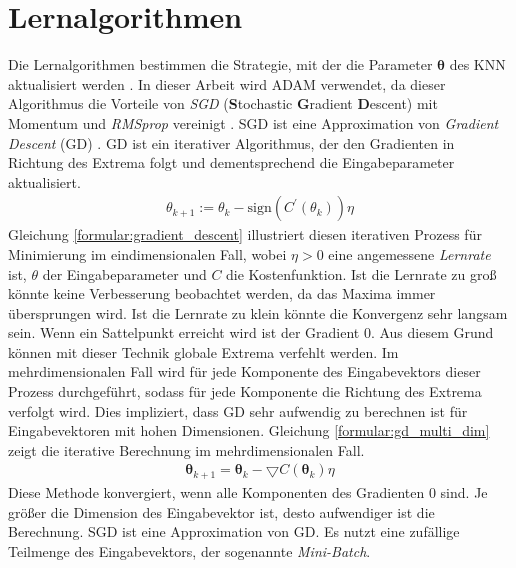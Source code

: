 \section{Lernalgorithmen}
Die Lernalgorithmen bestimmen die Strategie, mit der die Parameter $\boldsymbol\theta$ des KNN aktualisiert werden \cite{higham2019deep}.
In dieser Arbeit wird ADAM verwendet, da dieser Algorithmus die Vorteile von \textit{SGD} (\textbf{S}tochastic \textbf{G}radient \textbf{D}escent)
mit Momentum und \textit{RMSprop} vereinigt \cite{kingma2014adam, higham2019deep}.
\newline
\newline
SGD ist eine Approximation von \textit{Gradient Descent} (GD) \cite{bengio2017deep}.
GD ist ein iterativer Algorithmus, der den Gradienten in Richtung des Extrema folgt und dementsprechend die Eingabeparameter aktualisiert.
\begin{align}
    \label{formular:gradient_descent}
    \theta_{k+1} := \theta_k - \text{sign}(C^{\prime}(\theta_k))\eta
\end{align}
Gleichung \ref{formular:gradient_descent} illustriert diesen iterativen Prozess für Minimierung im eindimensionalen Fall,
wobei $\eta > 0$ eine angemessene \textit{Lernrate} ist, $\theta$ der Eingabeparameter und $C$ die Kostenfunktion.
Ist die Lernrate zu groß könnte keine Verbesserung beobachtet werden, da das Maxima immer übersprungen wird.
Ist die Lernrate zu klein könnte die Konvergenz sehr langsam sein.
Wenn ein Sattelpunkt erreicht wird ist der Gradient 0.
Aus diesem Grund können mit dieser Technik globale Extrema verfehlt werden.
\newline
\newline
Im mehrdimensionalen Fall wird für jede Komponente des Eingabevektors dieser Prozess durchgeführt, sodass für jede Komponente
die Richtung des Extrema verfolgt wird.
Dies impliziert, dass GD sehr aufwendig zu berechnen ist für Eingabevektoren mit hohen Dimensionen.
Gleichung \ref{formular:gd_multi_dim} zeigt die iterative Berechnung im mehrdimensionalen Fall.
\begin{align}
    \label{formular:gd_multi_dim}
    \boldsymbol\theta_{k+1} = \boldsymbol\theta_k - \bigtriangledown C(\boldsymbol\theta_k)\eta
\end{align}
Diese Methode konvergiert, wenn alle Komponenten des Gradienten 0 sind.
Je größer die Dimension des Eingabevektor ist, desto aufwendiger ist die Berechnung.
\newline
\newline
SGD ist eine Approximation von GD. Es nutzt eine zufällige Teilmenge des Eingabevektors, der sogenannte \textit{Mini-Batch}.
